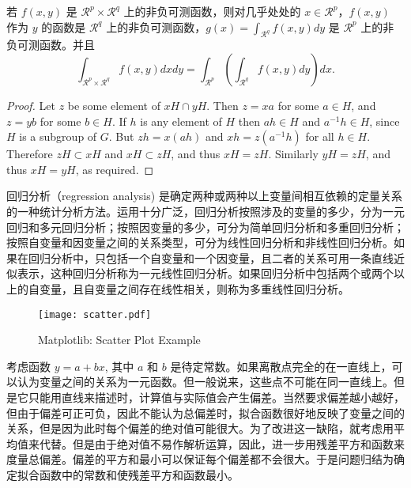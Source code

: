 \documentclass[geye,blue,normal,cn]{elegantnote}
\begin{document}
\begin{theorem}[Fubini 定理]
若 $f(x,y)$ 是 $\mathcal{R}^p\times\mathcal{R}^q$ 上的非负可测函数，则对几乎处处的 $x\in \mathcal{R}^p$，$f(x,y)$ 作为 $y$ 的函数是 $\mathcal{R}^q$ 上的非负可测函数，$g(x)=\int_{\mathcal{R}^q}f(x,y) dy$ 是 $\mathcal{R}^p$ 上的非负可测函数。并且
\begin{equation}
   \label{eq:461}
   \int_{\mathcal{R}^p\times\mathcal{R}^q} f(x,y) dxdy=\int_{\mathcal{R}^p}\left(\int_{\mathcal{R}^q}f(x,y)dy\right)dx.
\end{equation}
\end{theorem}

\begin{proof}
Let $z$ be some element of $xH \cap yH$.  Then $z = xa$ for some $a \in H$, and $z = yb$ for some $b \in H$. If $h$ is any element of $H$ then $ah \in H$ and $a^{-1}h \in H$, since $H$ is a subgroup of $G$. But $zh = x(ah)$ and $xh = z(a^{-1}h)$ for all $h \in H$. Therefore $zH \subset xH$ and $xH \subset zH$, and thus $xH = zH$.  Similarly $yH = zH$, and thus $xH = yH$, as required.
\end{proof}


回归分析（regression analysis) 是确定两种或两种以上变量间相互依赖的定量关系的一种统计分析方法。运用十分广泛，回归分析按照涉及的变量的多少，分为一元回归和多元回归分析；按照因变量的多少，可分为简单回归分析和多重回归分析；按照自变量和因变量之间的关系类型，可分为线性回归分析和非线性回归分析。如果在回归分析中，只包括一个自变量和一个因变量，且二者的关系可用一条直线近似表示，这种回归分析称为一元线性回归分析。如果回归分析中包括两个或两个以上的自变量，且自变量之间存在线性相关，则称为多重线性回归分析。

\begin{figure}[!htbp]
	\centering
	\texttt{[image: scatter.pdf]}
	\caption{Matplotlib: Scatter Plot Example\label{fig:mpg}}
\end{figure}

考虑函数 $y=a+bx$, 其中 $a$ 和 $b$ 是待定常数。如果离散点完全的在一直线上，可以认为变量之间的关系为一元函数。但一般说来，这些点不可能在同一直线上。但是它只能用直线来描述时，计算值与实际值会产生偏差。当然要求偏差越小越好，但由于偏差可正可负，因此不能认为总偏差时，拟合函数很好地反映了变量之间的关系，但是因为此时每个偏差的绝对值可能很大。为了改进这一缺陷，就考虑用平均值来代替。但是由于绝对值不易作解析运算，因此，进一步用残差平方和函数来度量总偏差。偏差的平方和最小可以保证每个偏差都不会很大。于是问题归结为确定拟合函数中的常数和使残差平方和函数最小。 
\end{document}
